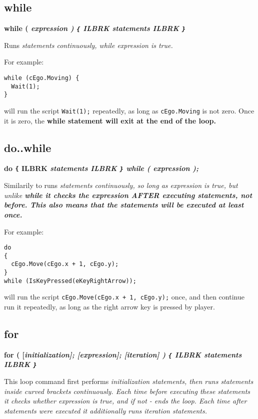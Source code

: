 \subsection{while}\label{whilestatement}%

\bf{while (} \it{expression} \bf{)}  \verb${$ ILBRK
  \it{statements} ILBRK
\verb$}$

Runs \it{statements} continuously, while \it{expression} is true.

For example:

\begin{verbatim}
while (cEgo.Moving) {
  Wait(1);
}
\end{verbatim}

will run the script \verb$Wait(1);$ repeatedly, as long as \verb$cEgo.Moving$ is
not zero. Once it is zero, the \bf{while} statement will exit at the end of the loop.


\subsection{do..while}\label{dowhilestatement}%

\bf{do}  \verb${$ ILBRK
  \it{statements} ILBRK
\verb$}$
\bf{while (} \it{expression} \bf{);}

Similarily to  runs \it{statements} continuously, so long as \it{expression} is true,
but unlike \bf{while} it checks the expression AFTER executing statements, not before. This also means that the statements
will be executed at least once.

For example:

\begin{verbatim}
do
{
  cEgo.Move(cEgo.x + 1, cEgo.y);
}
while (IsKeyPressed(eKeyRightArrow));
\end{verbatim}

will run the script \verb$cEgo.Move(cEgo.x + 1, cEgo.y);$ once, and then continue run it repeatedly, as long as the right
arrow key is pressed by player.


\subsection{for}\label{forstatement}%

\bf{for (} [\it{initialization}]\bf{;} [\it{expression}]\bf{;} [\it{iteration}] \bf{)}  \verb${$ ILBRK
  \it{statements} ILBRK
\verb$}$

This loop command first performs \it{initialization} statements, then runs \it{statements} inside curved brackets continuously.
Each time before executing these statements it checks whether \it{expression} is true, and if not - ends the loop.
Each time after statements were executed it additionally runs \it{iteration} statements.

